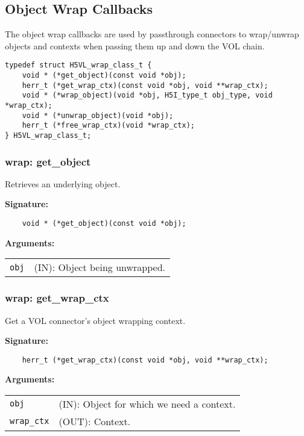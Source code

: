 
\subsection{Object Wrap Callbacks}
The object wrap callbacks are used by passthrough connectors to wrap/unwrap
objects and contexts when passing them up and down the VOL chain.

\begin{lstlisting}[caption={Wrap class for object wrapping routines, H5VLconnector.h}, captionpos=b, label={lst:Wrapclass}]
typedef struct H5VL_wrap_class_t {                                               
    void * (*get_object)(const void *obj);
    herr_t (*get_wrap_ctx)(const void *obj, void **wrap_ctx);
    void * (*wrap_object)(void *obj, H5I_type_t obj_type, void *wrap_ctx);
    void * (*unwrap_object)(void *obj);
    herr_t (*free_wrap_ctx)(void *wrap_ctx);
} H5VL_wrap_class_t; 
\end{lstlisting}

\subsubsection{wrap: get\_object}
Retrieves an underlying object.

\begin{mdframed}[style=bgbox]
\textbf{Signature:}
\begin{lstlisting}
    void * (*get_object)(const void *obj);
\end{lstlisting}

\textbf{Arguments:}\\
\begin{tabular}{l p{13.5cm}}
  \texttt{obj} & (IN): Object being unwrapped.\\
\end{tabular}
\end{mdframed}


\subsubsection{wrap: get\_wrap\_ctx}
Get a VOL connector's object wrapping context.

\begin{mdframed}[style=bgbox]
\textbf{Signature:}
\begin{lstlisting}
    herr_t (*get_wrap_ctx)(const void *obj, void **wrap_ctx);
\end{lstlisting}

\textbf{Arguments:}\\
\begin{tabular}{l p{13.5cm}}
  \texttt{obj} & (IN): Object for which we need a context.\\
  \texttt{wrap\_ctx} & (OUT): Context.\\
\end{tabular}
\end{mdframed}

